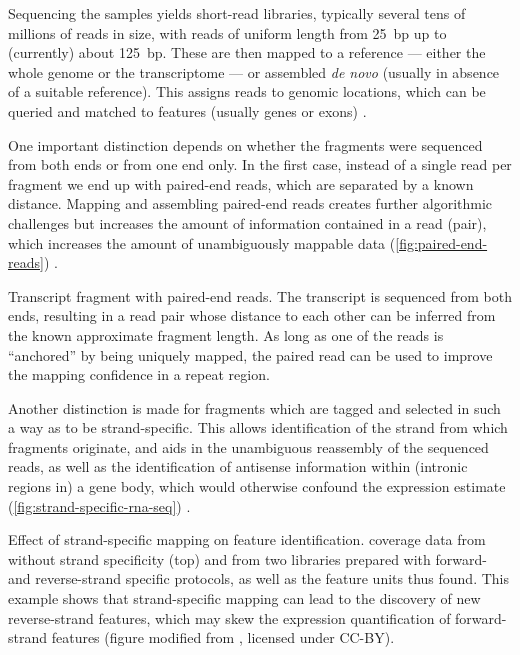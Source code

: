 Sequencing the \rnaseq samples yields short-read libraries, typically several
tens of millions of reads in size, with reads of uniform length from \SI{25}{bp}
up to (currently) about \SI{125}{bp}. These are then mapped to a reference ---
either the whole genome or the transcriptome --- or assembled \emph{de novo}
(usually in absence of a suitable reference). This assigns reads to genomic
locations, which can be queried and matched to features (usually genes or
exons) \citep{Cox:2007,Kim:2013,Anders:2014}.

One important distinction depends on whether the \cdna fragments were sequenced
from both ends or from one end only. In the first case, instead of a single read
per fragment we end up with paired-end reads, which are separated by a known
distance. Mapping and assembling paired-end reads creates further algorithmic
challenges but increases the amount of information contained in a read (pair),
which increases the amount of unambiguously mappable data
(\cref{fig:paired-end-reads}) \citep{Langmead:2012}.

    {Transcript fragment with paired-end reads.}
    {The transcript is sequenced from both ends, resulting in a read pair whose
    distance to each other can be inferred from the known approximate fragment
    length. As long as one of the reads is “anchored” by being uniquely mapped,
    the paired read can be used to improve the mapping confidence in a repeat
    region.}

Another distinction is made for fragments which are tagged and selected in such
a way as to be strand-specific. This allows identification of the strand from
which fragments originate, and aids in the unambiguous reassembly of the
sequenced reads, as well as the identification of antisense information within
(intronic regions in) a gene body, which would otherwise confound the expression
estimate (\cref{fig:strand-specific-rna-seq}) \citep{Yassour:2010}.

    {Effect of strand-specific mapping on feature identification.}
    {\rnaseq coverage data from  without strand specificity (top)
    and from two libraries prepared with forward- and reverse-strand specific
    protocols, as well as the feature units thus found. This example shows that
    strand-specific mapping can lead to the discovery of new reverse-strand
    features, which may skew the expression quantification of forward-strand
    features (figure modified from \citet{Yassour:2010}, licensed under CC-BY).}

